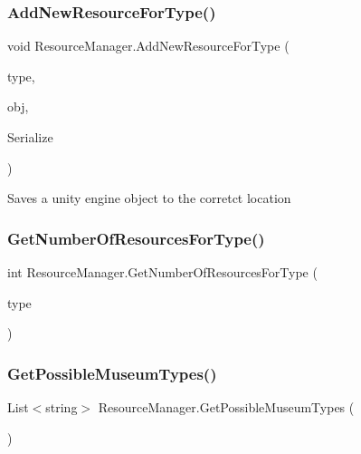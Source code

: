 \subsubsection{\texorpdfstring{Add\+New\+Resource\+For\+Type()}{AddNewResourceForType()}}
{\footnotesize\ttfamily void Resource\+Manager.\+Add\+New\+Resource\+For\+Type (\begin{DoxyParamCaption}\item[{string}]{type,  }\item[{Unity\+Engine.\+Object}]{obj,  }\item[{Func$<$ Unity\+Engine.\+Object, byte\mbox{[}$\,$\mbox{]}$>$}]{Serialize }\end{DoxyParamCaption})}



Saves a unity engine object to the corretct location 

\mbox{\label{class_resource_manager_a9ed8a67faa621d30d9790c0847f45a72}} 
\subsubsection{\texorpdfstring{Get\+Number\+Of\+Resources\+For\+Type()}{GetNumberOfResourcesForType()}}
{\footnotesize\ttfamily int Resource\+Manager.\+Get\+Number\+Of\+Resources\+For\+Type (\begin{DoxyParamCaption}\item[{string}]{type }\end{DoxyParamCaption})}

\mbox{\label{class_resource_manager_a72e9243fdaf77f0fb479f0cf4070ea22}} 
\subsubsection{\texorpdfstring{Get\+Possible\+Museum\+Types()}{GetPossibleMuseumTypes()}}
{\footnotesize\ttfamily List$<$string$>$ Resource\+Manager.\+Get\+Possible\+Museum\+Types (\begin{DoxyParamCaption}{ }\end{DoxyParamCaption})}



